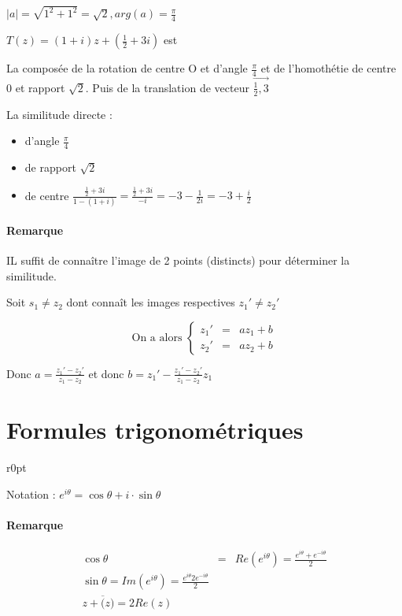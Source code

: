 $|a| = \sqrt{1^2+1^2} = \sqrt{2}, arg(a) = \frac{\pi}{4}$

$T(z) = (1+i)z + (\frac{1}{2} + 3i)$ est

La composée de la rotation de centre O et d'angle $\frac{\pi}{4}$ et de l'homothétie de centre 0 et rapport $\sqrt{2}$. Puis de la translation de vecteur $\vec{\frac{1}{2}, 3}$

La similitude directe :

\begin{itemize}
\item d'angle $\frac{\pi}{4}$
\item de rapport $\sqrt{2}$
\item de centre $\frac{\frac{1}{2} + 3i}{1-(1+i)} = \frac{\frac{1}{2}+3i}{-i} = -3 -\frac{1}{2i} = -3 + \frac{i}{2}$
\end{itemize}

\paragraph{Remarque} IL suffit de connaître l'image de 2 points (distincts) pour déterminer la similitude.

Soit $s_1 \neq z_2$ dont connaît les images respectives $z_1' \neq z_2'$

\[\text{On a alors } \left\{\begin{array}{rcl}
z_1' &=& az_1 + b \\
z_2' &=& az_2 + b
\end{array}\right.\]

Donc $a = \frac{z_1' - z_2'}{z_1 - z_2}$ et donc $b= z_1' - \frac{z_1' - z_2'}{z_1-z_2}z_1$

\section{Formules trigonométriques}
\begin{wrapfigure}[6]{r}{0pt}
\end{wrapfigure}

Notation : $e^{i \theta} = \cos \theta + i \cdot \sin \theta$

\paragraph{Remarque} \[\begin{array}{rcl}
	\cos \theta &=& Re(e^{i\theta}) = \frac{e^{i\theta} + e^{-i\theta}}{2} \\
	\sin \theta = Im (e^{i\theta}) = \frac{e^{i \theta} 2 e^{-i\theta}}{2} \\
	z + \overline(z) = 2 Re(z)\end{array}\]

